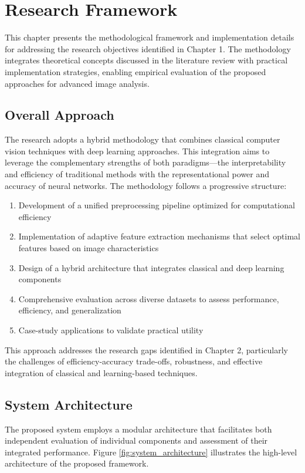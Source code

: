 \section{Research Framework}

This chapter presents the methodological framework and implementation details for addressing the research objectives identified in Chapter 1. The methodology integrates theoretical concepts discussed in the literature review with practical implementation strategies, enabling empirical evaluation of the proposed approaches for advanced image analysis.

\subsection{Overall Approach}
The research adopts a hybrid methodology that combines classical computer vision techniques with deep learning approaches. This integration aims to leverage the complementary strengths of both paradigms—the interpretability and efficiency of traditional methods with the representational power and accuracy of neural networks. The methodology follows a progressive structure:

\begin{enumerate}
    \item Development of a unified preprocessing pipeline optimized for computational efficiency
    \item Implementation of adaptive feature extraction mechanisms that select optimal features based on image characteristics
    \item Design of a hybrid architecture that integrates classical and deep learning components
    \item Comprehensive evaluation across diverse datasets to assess performance, efficiency, and generalization
    \item Case-study applications to validate practical utility
\end{enumerate}

This approach addresses the research gaps identified in Chapter 2, particularly the challenges of efficiency-accuracy trade-offs, robustness, and effective integration of classical and learning-based techniques.

\subsection{System Architecture}
The proposed system employs a modular architecture that facilitates both independent evaluation of individual components and assessment of their integrated performance. Figure \ref{fig:system_architecture} illustrates the high-level architecture of the proposed framework.

